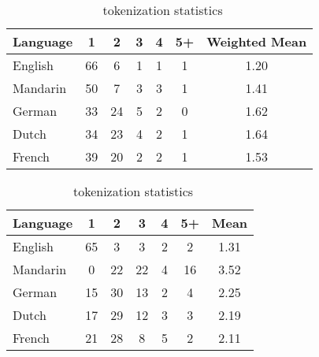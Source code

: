 \begin{table*}[h]
\caption{\gemma \ tokenization statistics}
\label{gemma-token-mean}
\vskip 0.15in
\begin{center}
\begin{small}
\begin{sc}
\begin{tabular}{l cccccc}
\toprule
Language & 1 & 2 & 3 & 4 & 5+ & Weighted Mean \\ \midrule
English & 66 & 6 & 1 & 1 & 1 & 1.20 \\
Mandarin & 50 & 7 & 3 & 3 & 1 & 1.41 \\
German & 33 & 24 & 5 & 2 & 0 & 1.62 \\
Dutch & 34 & 23 & 4 & 2 & 1 & 1.64 \\
French & 39 & 20 & 2 & 2 & 1 & 1.53 \\
\bottomrule
\end{tabular}
\end{sc}
\end{small}
\end{center}
\vskip -0.1in
\end{table*}

\begin{table*}[h]
\caption{\mistral \ tokenization statistics}
\label{mixtral-token-mean}
\vskip 0.15in
\begin{center}
\begin{small}
\begin{sc}
\begin{tabular}{l cccccc}
\toprule
Language & 1 & 2 & 3 & 4 & 5+ &  Mean \\ \midrule
English & 65 & 3 & 3 & 2 & 2 & 1.31 \\
Mandarin & 0 & 22 & 22 & 4 & 16 & 3.52 \\
German & 15 & 30 & 13 & 2 & 4 & 2.25 \\
Dutch & 17 & 29 & 12 & 3 & 3 & 2.19 \\
French & 21 & 28 & 8 & 5 & 2 & 2.11 \\
\bottomrule
\end{tabular}
\end{sc}
\end{small}
\end{center}
\vskip -0.1in
\end{table*}

